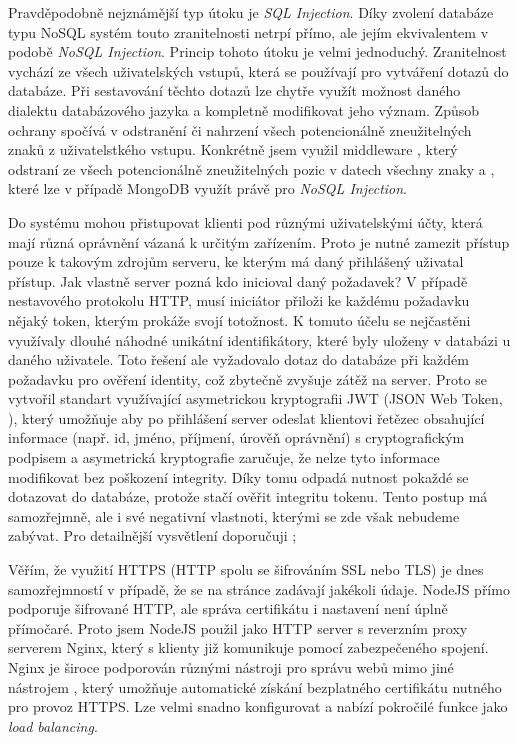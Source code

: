 Pravděpodobně nejznámější typ útoku je \textit{SQL Injection}. Díky zvolení databáze typu NoSQL systém touto zranitelnosti netrpí přímo, ale jejím ekvivalentem v podobě \textit{NoSQL Injection}. Princip tohoto útoku je velmi jednoduchý. Zranitelnost vychází ze všech uživatelských vstupů, která se používají pro vytváření dotazů do databáze. Při sestavování těchto dotazů lze chytře využít možnost daného dialektu databázového jazyka a kompletně modifikovat jeho význam. Způsob ochrany spočívá v odstranění či nahrzení všech potencionálně zneužitelných znaků z uživatelstkého vstupu. Konkrétně jsem využil middleware , který odstraní ze všech potencionálně zneužitelných pozic v datech všechny znaky \uv{\$} a , které lze v případě MongoDB využít právě pro \textit{NoSQL Injection}.

Do systému mohou přistupovat klienti pod různými uživatelskými účty, která mají různá oprávnění vázaná k určitým zařízením. Proto je nutné zamezit přístup pouze k takovým zdrojům serveru, ke kterým má daný přihlášený uživatal přístup. Jak vlastně server pozná kdo inicioval daný požadavek? V případě nestavového protokolu HTTP, musí iniciátor přiloži ke každému požadavku nějaký token, kterým prokáže svojí totožnost. K tomuto účelu se nejčastěni využívaly dlouhé náhodné unikátní identifikátory, které byly uloženy v databázi u daného uživatele. Toto řešení ale vyžadovalo dotaz do databáze při každém požadavku pro ověření identity, což zbytečně zvyšuje zátěž na server. Proto se vytvořil standart využívající asymetrickou kryptografii JWT (JSON Web Token, \cite[RFC 7519]{rfc-jwt}), který umožňuje aby po přihlášení server odeslat klientovi řetězec obsahující informace (např. id, jméno, příjmení, úrověň oprávnění) s cryptografickým podpisem a asymetrická kryptografie zaručuje, že nelze tyto informace modifikovat bez poškození integrity. Díky tomu odpadá nutnost pokaždé se dotazovat do databáze, protože stačí ověřit integritu tokenu. Tento postup má samozřejmně, ale i své negativní vlastnoti, kterými se zde však nebudeme zabývat. Pro detailnější vysvětlení doporučuji \cite{jwt-cons};

Věřím, že využití HTTPS (HTTP spolu se šifrováním SSL nebo TLS) je dnes samozřejmností v případě, že se na stránce zadávají jakékoli údaje. NodeJS přímo podporuje šifrované HTTP, ale správa certifikátu i nastavení není úplně přímočaré. Proto jsem NodeJS použil jako HTTP server s reverzním proxy serverem Nginx, který s klienty již komunikuje pomocí zabezpečeného spojení. Nginx je široce podporován různými nástroji pro správu webů mimo jiné nástrojem , který umožňuje automatické získání bezplatného certifikátu nutného pro provoz HTTPS. Lze velmi snadno konfigurovat a nabízí pokročilé funkce jako \textit{load balancing}.

